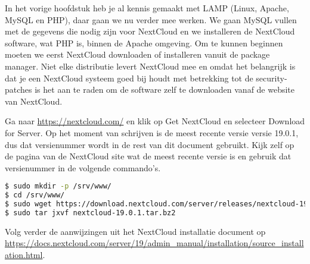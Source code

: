 In het vorige hoofdstuk heb je al kennis gemaakt met LAMP (Linux, Apache, MySQL en PHP), daar gaan we nu verder mee werken. We gaan MySQL vullen met de gegevens die nodig zijn voor NextCloud en we installeren de NextCloud software, wat PHP is, binnen de Apache omgeving. Om te kunnen beginnen moeten we eerst NextCloud downloaden of installeren vanuit de package manager. Niet elke distributie levert NextCloud mee en omdat het belangrijk is dat je een NextCloud systeem goed bij houdt met betrekking tot de security-patches is het aan te raden om de software zelf te downloaden vanaf de website van NextCloud.

Ga naar \url{https://nextcloud.com/} en klik op Get NextCloud en selecteer Download for Server. Op het moment van schrijven is de meest recente versie versie 19.0.1, dus dat versienummer wordt in de rest van dit document gebruikt. Kijk zelf op de pagina van de NextCloud site wat de meest recente versie is en gebruik dat versienummer in de volgende commando's.

\begin{lstlisting}[language=bash]
$ sudo mkdir -p /srv/www/
$ cd /srv/www/
$ sudo wget https://download.nextcloud.com/server/releases/nextcloud-19.0.1.tar.bz2
$ sudo tar jxvf nextcloud-19.0.1.tar.bz2
\end{lstlisting}

Volg verder de aanwijzingen uit het NextCloud installatie document op \url{https://docs.nextcloud.com/server/19/admin_manual/installation/source_installation.html}.

